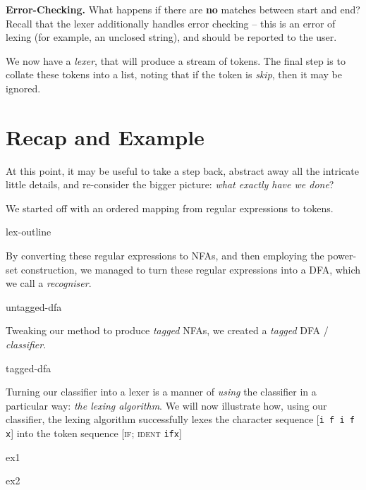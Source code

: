 \textbf{Error-Checking.} What happens if there are \textbf{no} matches between start and end? Recall that the lexer additionally handles error checking -- this is an error of lexing (for example, an unclosed string), and should be reported to the user.

We now have a \emph{lexer}, that will produce a stream of tokens. The final step is to collate these tokens into a list, noting that if the token is \textit{skip}, then it may be ignored. 

\section{Recap and Example}
At this point, it may be useful to take a step back, abstract away all the intricate little details, and re-consider the bigger picture: \textit{what exactly have we done}?

We started off with an ordered mapping from regular expressions to tokens. 

\begin{center}
    {lex-outline}
\end{center}

By converting these regular expressions to NFAs, and then employing the power-set construction, we managed to turn these regular expressions into a DFA, which we call a \emph{recogniser}. 

\begin{center}
{untagged-dfa}
\end{center}

Tweaking our method to produce \emph{tagged} NFAs, we created a \emph{tagged} DFA / \emph{classifier}.

\begin{center}
{tagged-dfa}
\end{center}

Turning our classifier into a lexer is a manner of \emph{using} the classifier in a particular way: \emph{the lexing algorithm}. We will now illustrate how, using our classifier, the lexing algorithm successfully lexes the character sequence [\texttt{i f  i f x}] into the token sequence [\textsc{if}; \textsc{ident} \texttt{ifx}]


\begin{minipage}{0.5\textwidth}
    {ex1}
\end{minipage}%
\begin{minipage}{0.5\textwidth}
    {ex2}
\end{minipage}

